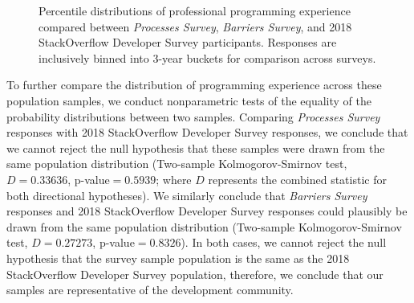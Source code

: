 \begin{figure}[!htbp]
\centering
{}
\caption{Percentile distributions of professional programming experience compared between \textit{Processes Survey}, \textit{Barriers Survey}, and 2018 StackOverflow Developer Survey participants. Responses are inclusively binned into 3-year buckets for comparison across surveys.\vspace*{-0.3\baselineskip}}
\label{populations}
\end{figure}

To further compare the distribution of programming experience across these population samples, we conduct nonparametric tests of the equality of the probability distributions between two samples.
Comparing \textit{Processes Survey} responses with 2018 StackOverflow Developer Survey responses, we conclude that we cannot reject the null hypothesis that these samples were drawn from the same population distribution (Two-sample Kolmogorov-Smirnov test, $D = 0.33636$, p-value$ = 0.5939$; where $D$ represents the combined statistic for both directional hypotheses).
We similarly conclude that \textit{Barriers Survey} responses and 2018 StackOverflow Developer Survey responses could plausibly be drawn from the same population distribution (Two-sample Kolmogorov-Smirnov test, $D = 0.27273$, p-value$ = 0.8326$).
In both cases, we cannot reject the null hypothesis that the survey sample population is the same as the 2018 StackOverflow Developer Survey population, therefore, we conclude that our samples are representative of the development community.

